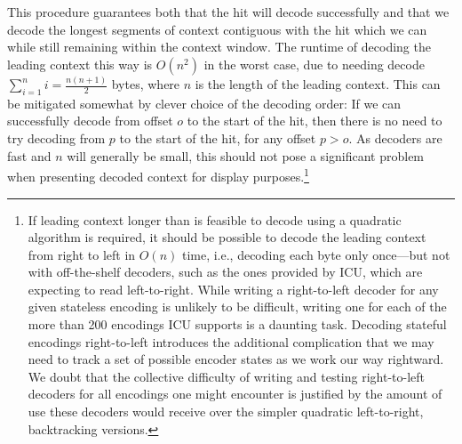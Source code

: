 \documentclass[5p,final,number,sort&compress]{elsarticle}
\begin{document}
This procedure guarantees both that the hit will decode successfully and that we decode the longest segments of context contiguous with the hit which we can while still remaining within the context window. The runtime of decoding the leading context this way is $O(n^2)$ in the worst case, due to needing decode $\sum^n_{i=1} i = \frac{n(n+1)}{2}$ bytes, where $n$ is the length of the leading context. This can be mitigated somewhat by clever choice of the decoding order: If we can successfully decode from offset $o$ to the start of the hit, then there is no need to try decoding from $p$ to the start of the hit, for any offset $p > o$. As decoders are fast and $n$ will generally be small, this should not pose a significant problem when presenting decoded context for display purposes.\footnote{If leading context longer than is feasible to decode using a quadratic algorithm is required, it should be possible to decode the leading context from right to left in $O(n)$ time, i.e., decoding each byte only once---but not with off-the-shelf decoders, such as the ones provided by ICU, which are expecting to read left-to-right. While writing a right-to-left decoder for any given stateless encoding is unlikely to be difficult, writing one for each of the more than 200 encodings ICU supports is a daunting task. Decoding stateful encodings right-to-left introduces the additional complication that we may need to track a set of possible encoder states as we work our way rightward. We doubt that the collective difficulty of writing and testing right-to-left decoders for all encodings one might encounter is justified by the amount of use these decoders would receive over the simpler quadratic left-to-right, backtracking versions.}
\end{document}
